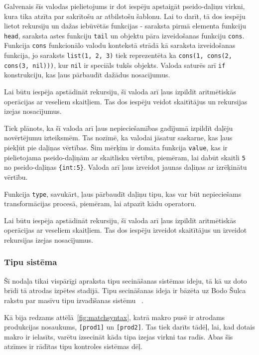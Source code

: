 Galvenais šīs valodas pielietojums ir dot iespēju apstaigāt pseido-daļiņu virkni, kura tika atzīta par sakrītošu ar atbilstošu šablonu. Lai to darīt, tā dos iespēju lietot rekursiju un dažas iebūvētās funkcijas - saraksta pirmā elementa funkciju \verb|head|, saraksta astes funkciju \verb|tail| un objektu pāra izveidošanas funkciju \verb|cons|. Funkcija \verb|cons| funkcionālo valodu kontekstā strādā kā saraksta izveidošanas funkcija, jo saraksts \verb|list(1, 2, 3)| tiek reprezentēta ka \verb|cons(1, cons(2, cons(3, nil)))|, kur \verb|nil| ir speciāls tukšs objekts. Valoda saturēs arī \verb|if| konstrukciju, kas ļaus pārbaudīt dažādus nosacījumus.

Lai būtu iespēja apstādināt rekursiju, šī valoda arī ļaus izpildīt aritmētiskās operācijas ar veseliem skaitļiem. Tas dos iespēju veidot skaitītājus un rekursijas izejas nosacījumus.

Tiek plānots, ka šī valoda arī ļaus nepieciešamības gadījumā izpildīt daļēju novērtējumu izteiksmēm. Tas nozīmē, ka valodai jāsatur saskarne, kas ļaus piekļūt pie daļiņas vērtības. Šim mērķim ir domāta funkcija \verb|value|, kas ir pielietojama pseido-daļiņām ar skaitlisku vērtību, piemēram, lai dabūt skaitli \verb|5| no pseido-daļiņas \verb|{int:5}|. Valoda arī ļaus izveidot jaunas daļiņas ar izrēķinātu vērtību.

Funkcija \verb|type|, savukārt, ļaus pārbaudīt daļiņu tipu, kas var būt nepieciešams transformācijas procesā, piemēram, lai atpazīt kādu operatoru.

Lai būtu iespēja apstādināt rekursiju, šī valoda arī ļaus izpildīt aritmētiskās operācijas ar veseliem skaitļiem. Tas dos iespēju izveidot skaitītājus un izveidot rekursijas izejas nosacījumus.

\subsubsection{\label{sbsbs:sys_typesystem}Tipu sistēma}

Šī nodaļa tikai vispārīgi apraksta tipu secināšanas sistēmas ideju, tā kā uz doto brīdi tā atrodas izpētes stadijā. Tipu secināšanas ideja ir bāzēta uz Bodo Šulca rakstu par masīvu tipu izvadīšanas sistēmu ~\cite{Scholz:SACTypeSystem}.

Kā bija redzams attēlā~\ref{fig:matchsyntax}, katrā makro pusē ir atrodams produkcijas nosaukums, \verb|[prod1]| un \verb|[prod2]|. Tas tiek darīts tādēļ, lai, kad dotais makro ir ielasīts, varētu izsecināt kāda tipa izejas virkni tas radīs. Abas šīs atzīmes ir rādītas tipu kontroles sistēmas dēļ.

